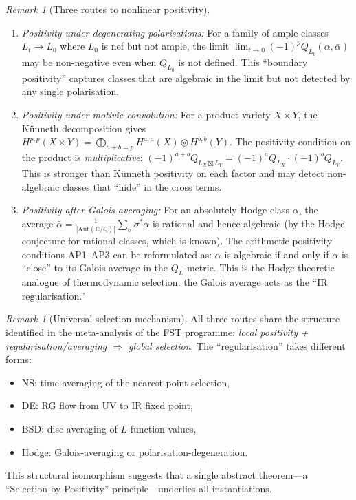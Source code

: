 \documentclass[aps,prd,twocolumn,superscriptaddress,nofootinbib]{revtex4-2}
\theoremstyle{definition}
\theoremstyle{remark}
\newtheorem{remark}[theorem]{Remark}
\begin{document}
\begin{remark}[Three routes to nonlinear positivity]
\label{rem:nonlinear-positivity}
\begin{enumerate}
\item \emph{Positivity under degenerating polarisations:} For a family of ample classes $L_t \to L_0$ where $L_0$ is nef but not ample, the limit $\lim_{t \to 0} (-1)^p Q_{L_t}(\alpha, \bar\alpha)$ may be non-negative even when $Q_{L_0}$ is not defined. This ``boundary positivity'' captures classes that are algebraic in the limit but not detected by any single polarisation.

\item \emph{Positivity under motivic convolution:} For a product variety $X \times Y$, the K\"unneth decomposition gives $H^{p,p}(X \times Y) = \bigoplus_{a+b=p} H^{a,a}(X) \otimes H^{b,b}(Y)$. The positivity condition on the product is \emph{multiplicative}: $(-1)^{a+b} Q_{L_X \boxtimes L_Y} = (-1)^a Q_{L_X} \cdot (-1)^b Q_{L_Y}$. This is stronger than K\"unneth positivity on each factor and may detect non-algebraic classes that ``hide'' in the cross terms.

\item \emph{Positivity after Galois averaging:} For an absolutely Hodge class $\alpha$, the average $\bar\alpha = \frac{1}{|\mathrm{Aut}(\mathbb{C}/\mathbb{Q})|} \sum_{\sigma} \sigma^* \alpha$ is rational and hence algebraic (by the Hodge conjecture for rational classes, which is known). The arithmetic positivity conditions AP1--AP3 can be reformulated as: $\alpha$ is algebraic if and only if $\alpha$ is ``close'' to its Galois average in the $Q_L$-metric. This is the Hodge-theoretic analogue of thermodynamic selection: the Galois average acts as the ``IR regularisation.''
\end{enumerate}
\end{remark}

\begin{remark}[Universal selection mechanism]
\label{rem:universal-selection}
All three routes share the structure identified in the meta-analysis of the FST programme: \emph{local positivity + regularisation/averaging $\Rightarrow$ global selection}. The ``regularisation'' takes different forms:
\begin{itemize}
\item NS: time-averaging of the nearest-point selection,
\item DE: RG flow from UV to IR fixed point,
\item BSD: disc-averaging of $L$-function values,
\item Hodge: Galois-averaging or polarisation-degeneration.
\end{itemize}
This structural isomorphism suggests that a single abstract theorem---a ``Selection by Positivity'' principle---underlies all instantiations.
\end{remark}
\end{document}
